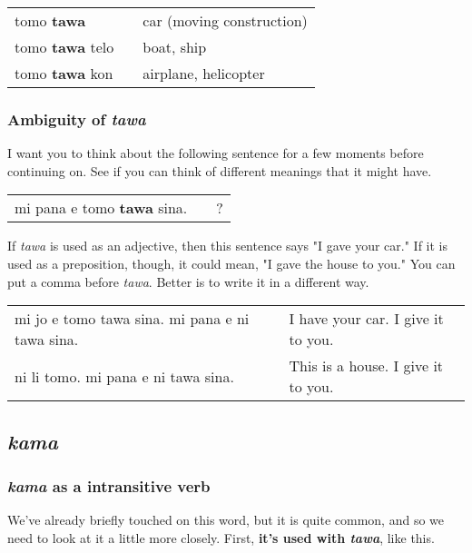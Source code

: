 \begin{supertabular}{p{5,5cm}|ll}
tomo \textbf{tawa} && car (moving construction) \\
tomo \textbf{tawa} telo && boat, ship \\
tomo \textbf{tawa} kon && airplane, helicopter \\
\end{supertabular} 
%
\subsubsection*{Ambiguity of \textit{tawa}}
%
I want you to think about the following sentence for a few moments before continuing on. 
See if you can think of different meanings that it might have. 

\begin{supertabular}{p{5,5cm}|ll}
mi pana e tomo \textbf{tawa} sina. && ? \\   %
\end{supertabular} 

If \textit{tawa} is used as an adjective, then this sentence says "I gave your car." 
If it is used as a preposition, though, it could mean, "I gave the house to you." 
You can put a comma before \textit{tawa}. 
Better is to write it in a different way.

\begin{supertabular}{p{5,5cm}|ll}
mi jo e tomo tawa sina. mi pana e ni tawa sina. && I have your car. I give it to you. \\
ni li tomo. mi pana e ni tawa sina. && This is a house. I give it to you. \\
\end{supertabular} 

%
{}
\subsection*{\textit{kama}}
\subsubsection*{\textit{kama} as a intransitive verb}
%
We've already briefly touched on this word, but it is quite common, and so we need to look at it a little more closely. 
First, \textbf{it's used with \textit{tawa}}, like this.

